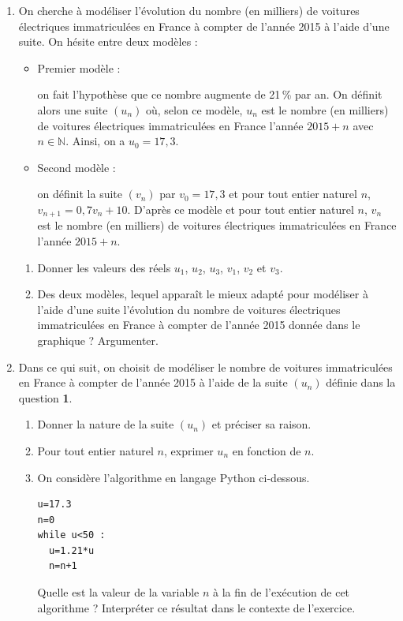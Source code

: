 \documentclass[10pt]{article}
\providecommand{\N}{\mathbb{N}}
\begin{document}
\begin{enumerate}
\item  On cherche à modéliser l'évolution du nombre (en milliers) de voitures électriques immatriculées en France à compter de l'année 2015 à l'aide d'une suite. On hésite entre deux modèles :
\begin{itemize}
\item Premier modèle : 

on fait l'hypothèse que ce nombre augmente de 21\,\% par an. On définit alors une suite $\left(u_n\right)$ où, selon ce modèle, $u_n$ est le nombre (en milliers) de voitures électriques immatriculées en France l'année $2015+n$ avec $n\in \N$. Ainsi, on a $u_0=17,3$.
\item Second modèle :

on définit la suite $\left(v_n\right)$ par $v_0= 17,3$ et pour tout entier naturel $n$,
 \mbox{$v_{n+1}= 0,7v_n + 10$}. D'après ce modèle et pour tout entier naturel $n$, $v_n$ est le nombre (en milliers) de voitures électriques immatriculées en France l'année $2015+n$.
\end{itemize}

\begin{enumerate}
\item Donner les valeurs des réels $u_1$, $u_2$, $u_3$, $v_1$, $v_2$ et $v_3$.
\item Des deux modèles, lequel apparaît le mieux adapté pour modéliser à l'aide d'une suite l'évolution du nombre de voitures électriques immatriculées en France à compter de l'année 2015 donnée dans le graphique ? Argumenter.
\end{enumerate}
\item Dans ce qui suit, on choisit de modéliser le nombre de voitures immatriculées en France à compter de l'année 2015 à l'aide de la suite $\left(u_n\right)$ définie dans la question \textbf{1}.
	\begin{enumerate}
		\item  Donner la nature de la suite $\left(u_n\right)$ et préciser sa raison.
		\item Pour tout entier naturel $n$, exprimer $u_n$ en fonction de $n$.
		\item On considère l'algorithme en langage Python ci-dessous.
\begin{center}
\begin{lstlisting}[style=python]
u=17.3
n=0
while u<50 :
  u=1.21*u
  n=n+1
\end{lstlisting}
\end{center}

Quelle est la valeur de la variable $n$ à la fin de l'exécution de cet algorithme ? Interpréter ce
résultat dans le contexte de l'exercice.
	\end{enumerate}
\end{enumerate}

\vspace{0,5cm}
\end{document}
